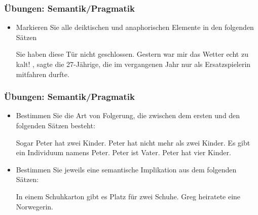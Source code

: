 \begin{frame}
\frametitle{Übungen: Semantik/Pragmatik}

\begin{itemize}
	\item Markieren Sie alle deiktischen und anaphorischen Elemente in den folgenden Sätzen
	
	\eal
	\ex Sie haben diese Tür nicht geschlossen.
	\ex Gestern war mir das Wetter echt zu kalt!
	\ex {}, sagte die 27-Jährige, die im vergangenen Jahr nur als Ersatzspielerin mitfahren durfte.
	\zl
	
\end{itemize}

\end{frame}


\begin{frame}
\frametitle{Übungen: Semantik/Pragmatik}

\begin{itemize}
	\item Bestimmen Sie die Art von Folgerung, die zwischen dem ersten und den folgenden Sätzen besteht:
	
	\eal 
	\ex Sogar Peter hat zwei Kinder. 
	\ex Peter hat nicht mehr als zwei Kinder.
	\ex Es gibt ein Individuum namens Peter.
	\ex Peter ist Vater.
	\ex Peter hat vier Kinder.
	\zl
	
	\item Bestimmen Sie jeweils eine semantische Implikation aus dem folgenden Sätzen:
	
	\eal
	\ex In einem Schuhkarton gibt es Platz für zwei Schuhe.
	\ex Greg heiratete eine Norwegerin.
	\zl
		
\end{itemize}

\end{frame}


